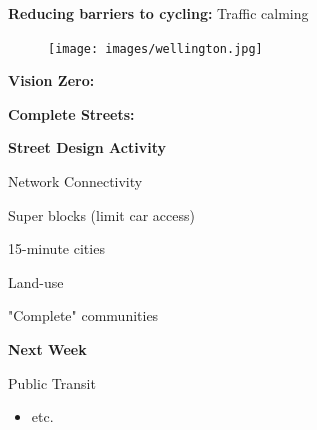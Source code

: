 \documentclass[aspectratio=169]{beamer}
\begin{document}
\begin{frame}
	
	\textbf{Reducing barriers to cycling:} Traffic calming
	
	\begin{figure}
		\centering
		\texttt{[image: images/wellington.jpg]}
	\end{figure}
	
\end{frame}




\begin{frame}
	
	\textbf{Vision Zero:} 
	

	
\end{frame}





\begin{frame}
	
	\textbf{Complete Streets:} 
	
	
	
\end{frame}






\begin{frame}
	
	\textbf{Street Design Activity}
	
\end{frame}



\begin{frame}
	
	Network Connectivity
	
\end{frame}



\begin{frame}
	
	Super blocks (limit car access)
	
\end{frame}



\begin{frame}
	
	15-minute cities
	
	Land-use
	
	"Complete" communities
		
\end{frame}




\begin{frame}
	\textbf{Next Week} 
	
	\vspace{4mm}
	
	Public Transit
	
	\begin{itemize}
				
		
		\item etc.
				
		
	\end{itemize}
	
\end{frame}
\end{document}
